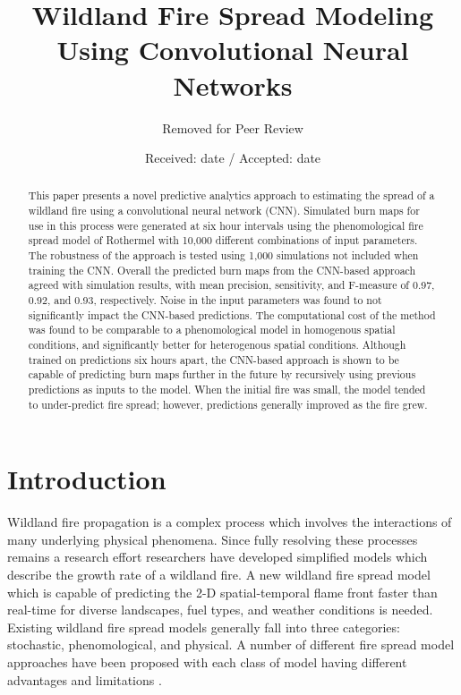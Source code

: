 \documentclass[smallcondensed]{svjour3}     %
\begin{document}
\title{Wildland Fire Spread Modeling Using Convolutional Neural Networks
}
\author{Removed for Peer Review}


\date{Received: date / Accepted: date}


\maketitle

\begin{abstract}
This paper presents a novel predictive analytics approach to estimating
the spread of a wildland fire using a convolutional neural network
(CNN). Simulated burn maps for use in this process were
generated at six hour intervals using the phenomological fire spread model
of Rothermel with 10,000 different combinations of input parameters.
The robustness of the approach is tested using 1,000 simulations not
included when training the CNN. Overall the predicted burn maps 
from the CNN-based approach agreed with simulation results,
with mean precision, sensitivity, and F-measure of 0.97, 0.92, and 0.93,
respectively. Noise in the input parameters was found to not significantly
impact the CNN-based predictions. The computational cost of the method
was found to be comparable to a phenomological model in homogenous spatial
conditions, and significantly better for heterogenous spatial conditions.
Although trained on predictions six hours apart, the
CNN-based approach is shown to be capable of predicting burn maps
further in the future by recursively using previous predictions as inputs to
the model. When the initial fire was small, the model tended to under-predict
fire spread; however, predictions generally improved as the fire grew.

\end{abstract}




\section{Introduction}
\label{intro}

Wildland fire propagation is a complex process which involves the
interactions of many underlying physical phenomena. Since fully
resolving these processes remains a research effort researchers
have developed simplified models which describe the growth rate
of a wildland fire.
A new wildland fire spread model which is capable of predicting the 2-D
spatial-temporal flame front faster than real-time for diverse landscapes,
fuel types, and weather conditions is needed.
Existing wildland fire spread models generally fall into three
categories: stochastic, phenomological, and physical.
A number of different fire spread model approaches have been
proposed with each class of model having different advantages and limitations
\cite{weber1991modelling,sullivan2007a,sullivan2007b}.
\end{document}
